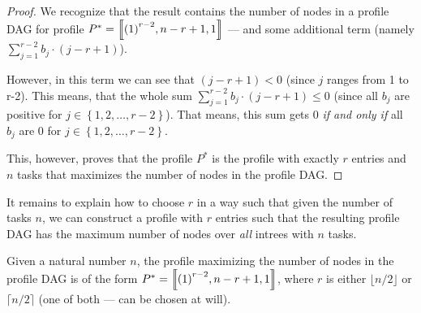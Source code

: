\begin{proof}
  We recognize that the result contains the number of nodes in a profile DAG for profile $P^*=\left\llbracket {(1)}^{r-2},n-r+1,1 \right\rrbracket$ --- and some additional term (namely $\sum_{j=1}^{r-2} b_j \cdot (j-r+1)$).

  However, in this term we can see that $(j-r+1) < 0$ (since $j$ ranges from 1 to r-2). This means, that the whole sum $\sum_{j=1}^{r-2} b_j \cdot (j-r+1) \leq 0$ (since all $b_j$ are positive for $j\in\left\{ 1,2,\dots,r-2\right\}$). That means, this sum gets 0 \emph{if and only if} all $b_j$ are 0 for $j\in\left\{ 1,2,\dots,r-2\right\}$.

  This, however, proves that the profile $P^*$ is the profile with exactly $r$ entries and $n$ tasks that maximizes the number of nodes in the profile DAG.
\end{proof}

It remains to explain how to choose $r$ in a way such that given the number of tasks $n$, we can construct a profile with $r$ entries such that the resulting profile DAG has the maximum number of nodes over \emph{all} intrees with $n$ tasks.

\begin{lemma}
  \label{lemma:worst-case-profile-structure}
  Given a natural number $n$, the profile maximizing the number of nodes in the profile DAG is of the form $P^*=\left\llbracket {(1)}^{r-2},n-r+1,1 \right\rrbracket$, where $r$ is either $\lfloor n/2\rfloor$ or $\lceil n/2 \rceil$ (one of both --- can be chosen at will).
\end{lemma}


